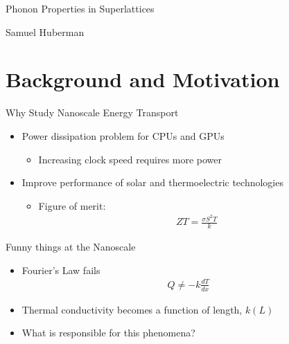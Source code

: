 \documentclass{beamer}
\begin{document}
\begin{frame}
\Large{Phonon Properties in Superlattices}

\small{Samuel Huberman}\\

\date{
	\\
	\vspace{1cm}
	\today
}
\end{frame}

\section{Background and Motivation}
\begin{frame}{Why Study Nanoscale Energy Transport}
\begin{itemize}
\item Power dissipation problem for CPUs and GPUs
\begin{itemize}
\item Increasing clock speed requires more power
\end{itemize}
\item Improve performance of solar and thermoelectric technologies
\begin{itemize}
\item Figure of merit:
\begin{equation}\label{EQ:NMD:qdot}
\begin{split}
ZT=\frac{\sigma S^2 T}{k}
\end{split}
\end{equation}
\end{itemize}
\end{itemize}
\end{frame}

\begin{frame}{Funny things at the Nanoscale}
\begin{itemize}
\item Fourier's Law fails
\begin{equation}\label{EQ:NMD:qdot}
\begin{split}
Q\neq-k\frac{dT}{dx}
\end{split}
\end{equation}

\item Thermal conductivity becomes a function of length, $k(L)$

\item What is responsible for this phenomena?
\end{itemize}
\end{frame}
\end{document}
